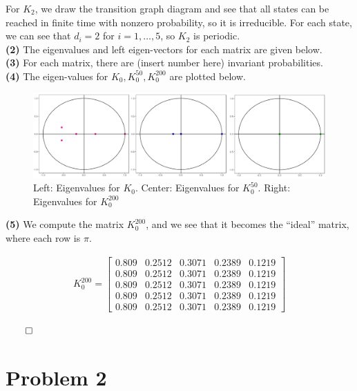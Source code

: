 \documentclass[5pt]{article}
\begin{document}
For $K_2$, we draw the transition graph diagram and see that all states can be reached in finite time with nonzero probability, so it is irreducible. For each state, we can see that $d_i = 2$ for $i = 1, \ldots, 5$, so $K_2$ is periodic. \\

\textbf{(2)} The eigenvalues and left eigen-vectors for each matrix are given below. \\


\textbf{(3)} For each matrix, there are (insert number here) invariant probabilities. \\


\textbf{(4)} The eigen-values for $K_0, K_0^{50}, K_{0}^{200}$ are plotted below. \\

\begin{figure}[H]
\begin{center}
\includegraphics[width = 1\columnwidth]{eigen_values}
\caption{Left: Eigenvalues for $K_0$. Center: Eigenvalues for $K_0^{50}$. Right: Eigenvalues for $K_0^{200}$}
\end{center}
\end{figure}


\textbf{(5)} We compute the matrix $K_0^{200}$, and we see that it becomes the ``ideal'' matrix, where each row is $\pi$.

\begin{align*}
K_0^{200} = 
	\begin{bmatrix}
		0.809 & 0.2512 & 0.3071 & 0.2389 & 0.1219 \\		
		0.809 & 0.2512 & 0.3071 & 0.2389 & 0.1219 \\	
		0.809 & 0.2512 & 0.3071 & 0.2389 & 0.1219 \\	
		0.809 & 0.2512 & 0.3071 & 0.2389 & 0.1219 \\	
		0.809 & 0.2512 & 0.3071 & 0.2389 & 0.1219
	\end{bmatrix}
\end{align*}

\hfill $\qed$


\section{Problem 2}
\end{document}
